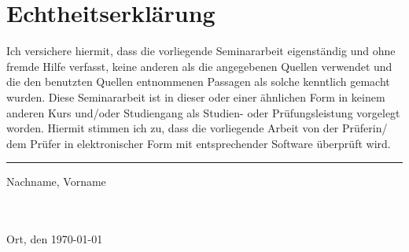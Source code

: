\newpage
\thispagestyle{empty}
\section*{Echtheitserklärung}
Ich versichere hiermit, dass die vorliegende Seminararbeit eigenständig und ohne fremde Hilfe verfasst, keine anderen als die angegebenen Quellen verwendet und die den benutzten Quellen entnommenen Passagen als solche kenntlich gemacht wurden. Diese Seminararbeit ist in dieser oder einer ähnlichen Form in keinem anderen Kurs und/oder Studiengang als Studien- oder Prüfungsleistung vorgelegt worden. Hiermit stimmen ich zu, dass die vorliegende Arbeit von der Prüferin/ dem Prüfer in elektronischer Form mit entsprechender Software überprüft wird.

\vspace{25pt} 
\noindent\rule{5cm}{.4pt}\hfill\par 
\noindent Nachname, Vorname

~\\\\
Ort, den {\today}
